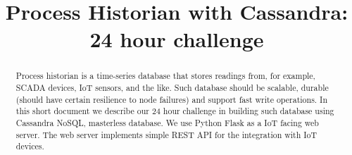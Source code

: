 \documentclass[conference,10pt,letter]{IEEEtran}
\begin{document}
\sloppy
\title{Process Historian with Cassandra: 24 hour challenge}
\maketitle
\begin{abstract}
Process historian is a time-series database that stores readings 
from, for example, SCADA devices, IoT sensors, and the like. 
Such database should be scalable, durable (should have certain 
resilience to node failures) and support fast write operations.
In this short document we describe our 24 hour challenge in
building such database using Cassandra NoSQL, masterless database.
We use Python Flask as a IoT facing web server. The web server
implements simple REST API for the integration with IoT devices.
\end{abstract}

 




\balance


\end{document}
